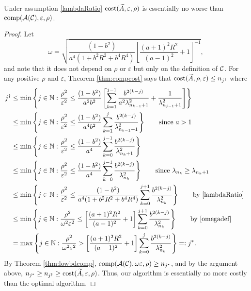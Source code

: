 \documentclass[graybox,footinfo]{svmult}
\begin{document}
\begin{theorem}
\label{thm:CostNoWorse}
Under assumption \eqref{lambdaRatio} $\textup{cost}(\widetilde{A},\varepsilon,\rho)$ is essentially no worse than $\textup{comp}({\mathcal{A}}({\mathcal{C}}),\varepsilon,\rho)$.
\end{theorem}
\begin{proof}
Let  
\begin{equation} \label{omegadef}
    \omega = \sqrt{\frac{(1 - b^2)}{a^4(1 + b^2R^2 + b^4R^4)}\left[\frac{(a+1)^{2} R^2 }{(a-1)^2} + 1\right]^{-1}},
\end{equation}
and note that it does not depend on $\rho$ or $\varepsilon$ but only on the definition of ${\mathcal{C}}$. 
For any positive $\rho$ and $\varepsilon$, Theorem \ref{thm:compcost} says that $\textup{cost}(\widetilde{A},\rho,\varepsilon) \le n_{j^\dagger}$ where 
\begin{align*} 
j^\dagger &\le \min \left \{j \in {\mathbb{N}} : \frac{\rho^2}{\varepsilon^2} \le \frac{(1 - b^2)}{a^2b^2} \left[ \sum_{k=1}^{j-1} \frac{b^{2(k-j)}}{a^2\lambda_{n_{k-1}+1}^2} + \frac{1}{\lambda_{n_{j-1}+1}^2}\right]   \right\} \\
&\le \min \left \{j \in {\mathbb{N}} : \frac{\rho^2}{\varepsilon^2} \le \frac{(1 - b^2)}{a^4b^2} \sum_{k=1}^{j} \frac{b^{2(k-j)}}{\lambda_{n_{k-1}+1}^2} \right\} \qquad \text{since } a > 1\\
&\le \min \left \{j \in {\mathbb{N}} : \frac{\rho^2}{\varepsilon^2} \le \frac{(1 - b^2)}{a^4} \sum_{k=0}^{j-1} \frac{b^{2(k-j)}}{\lambda_{n_{k}+1}^2} \right\} \\
&\le \min \left \{j \in {\mathbb{N}} : \frac{\rho^2}{\varepsilon^2} \le \frac{(1 - b^2)}{a^4} \sum_{k=0}^{j-1} \frac{b^{2(k-j)}}{\lambda_{n_{k}}^2} \right\} \qquad \text{since } \lambda_{n_k} \ge \lambda_{n_k+1}\\
&\le \min \left \{j \in {\mathbb{N}} : \frac{\rho^2}{\varepsilon^2} \le \frac{(1 - b^2)}{a^4(1 + b^2R^2 + b^4R^4)} \sum_{k=0}^{j+1} \frac{b^{2(k-j)}}{\lambda_{n_{k}}^2} \right\} \qquad \text{by \eqref{lambdaRatio} } \\
&\le \min \left \{j \in {\mathbb{N}} : \frac{\rho^2}{\omega^2 \varepsilon^2} \le \left[\frac{(a+1)^{2} R^2 }{(a-1)^2} + 1\right] \sum_{k=0}^{j+1} \frac{b^{2(k-j)}}{\lambda_{n_{k}}^2} \right\} \qquad \text{by \eqref{omegadef} } \\
&= \max \left \{j \in {\mathbb{N}} : \frac{\rho^2}{\omega^2 \varepsilon^2} > \left[\frac{(a+1)^{2} R^2 }{(a-1)^2} + 1\right] \sum_{k=0}^{j} \frac{b^{2(k-j)}}{\lambda_{n_{k}}^2} \right\} =:j^*.
\end{align*}
By Theorem \ref{thm:lowbdcomp}, $\textup{comp}({\mathcal{A}}({\mathcal{C}}),\omega\varepsilon,\rho) \ge n_{j^*}$, and by the argument above, $n_{j^*} \ge n_{j^\dagger} \ge \textup{cost}(\widetilde{A},\varepsilon,\rho)$.  Thus, our algorithm is essentially no more costly than the optimal algorithm.
\end{proof}
\end{document}
